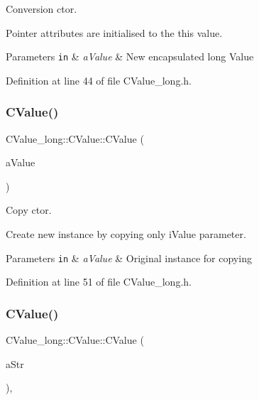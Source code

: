 Conversion c\textquotesingle{}tor. 

Pointer attributes are initialised to the {\ttfamily this} value. 
\begin{DoxyParams}[1]{Parameters}
\mbox{\tt in}  & {\em a\+Value} & New encapsulated {\ttfamily long} Value \\
\hline
\end{DoxyParams}


Definition at line 44 of file C\+Value\+\_\+long.\+h.

\mbox{\label{class_c_value__long_1_1_c_value_a88c1a4c4f4f157417b382f2ea9f7836d}} 
\subsubsection{\texorpdfstring{C\+Value()}{CValue()}\hspace{0.1cm}{\footnotesize\ttfamily [3/4]}}
{\footnotesize\ttfamily C\+Value\+\_\+long\+::\+C\+Value\+::\+C\+Value (\begin{DoxyParamCaption}\item[{const \hyperlink{class_c_value__long_1_1_c_value}{C\+Value} \&}]{a\+Value }\end{DoxyParamCaption})\hspace{0.3cm}{\ttfamily [inline]}}



Copy c\textquotesingle{}tor. 

Create new instance by copying only {\ttfamily i\+Value} parameter. 
\begin{DoxyParams}[1]{Parameters}
\mbox{\tt in}  & {\em a\+Value} & Original instance for copying \\
\hline
\end{DoxyParams}


Definition at line 51 of file C\+Value\+\_\+long.\+h.

\mbox{\label{class_c_value__long_1_1_c_value_a098c962b0bcf399ec9179ac5dd9cc42f}} 
\subsubsection{\texorpdfstring{C\+Value()}{CValue()}\hspace{0.1cm}{\footnotesize\ttfamily [4/4]}}
{\footnotesize\ttfamily C\+Value\+\_\+long\+::\+C\+Value\+::\+C\+Value (\begin{DoxyParamCaption}\item[{const char $\ast$}]{a\+Str }\end{DoxyParamCaption})\hspace{0.3cm}{\ttfamily [inline]}, {\ttfamily [explicit]}}



